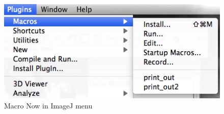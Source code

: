 \begin{indentexercise}{3}
\begin{figure}[htbp]
\begin{center}
\includegraphics[scale=0.6]{fig/firstMacroSetInMenu.png}
\caption{Macro Now in ImageJ menu} \label{fig_MacroInMenu}
\end{center}
\end{figure}
\end{indentexercise}
